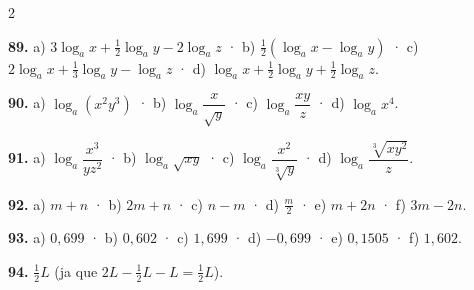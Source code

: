 \documentclass[13pt,a4paper]{extarticle}
\begin{document}
\begin{multicols}{2}
\begin{minipage}{\linewidth}
\end{minipage}\par\vspace{1.6mm}
\par\noindent\begin{minipage}{\linewidth}
\textbf{89.} a) $3\log_a x+\tfrac12\log_a y-2\log_a z$ · b) $\tfrac12\left(\log_a x-\log_a y\right)$ · c) $2\log_a x+\tfrac13\log_a y-\log_a z$ · d) $\log_a x+\tfrac12\log_a y+\tfrac12\log_a z$.\par
\end{minipage}\par\vspace{1.6mm}
\par\noindent\begin{minipage}{\linewidth}
\textbf{90.} a) $\log_a\left(x^2y^3\right)$ · b) $\log_a\dfrac{x}{\sqrt y}$ · c) $\log_a\dfrac{xy}{z}$ · d) $\log_a x^4$.\par
\end{minipage}\par\vspace{1.6mm}
\par\noindent\begin{minipage}{\linewidth}
\textbf{91.} a) $\log_a\dfrac{x^3}{yz^2}$ · b) $\log_a\sqrt{xy}$ · c) $\log_a\dfrac{x^2}{\sqrt[3]{y}}$ · d) $\log_a\dfrac{\sqrt[3]{xy^2}}{z}$.\par
\end{minipage}\par\vspace{1.6mm}
\par\noindent\begin{minipage}{\linewidth}
\textbf{92.} a) $m+n$ · b) $2m+n$ · c) $n-m$ · d) $\tfrac{m}{2}$ · e) $m+2n$ · f) $3m-2n$.\par
\end{minipage}\par\vspace{1.6mm}
\par\noindent\begin{minipage}{\linewidth}
\textbf{93.} a) $0{,}699$ · b) $0{,}602$ · c) $1{,}699$ · d) $-0{,}699$ · e) $0{,}1505$ · f) $1{,}602$.\par
\end{minipage}\par\vspace{1.6mm}
\par\noindent\begin{minipage}{\linewidth}
\textbf{94.} $\tfrac12 L$ (ja que $2L-\tfrac12L-L=\tfrac12L$).\par

\end{minipage}
\end{multicols}
\end{document}
